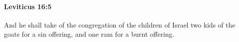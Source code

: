 
		\paragraph{Leviticus 16:5} %
			\label{LEVITICUS-16-5}

			And he shall take of the congregation of the children of Israel two kids of the goats for a sin offering, and one ram for a burnt offering.


